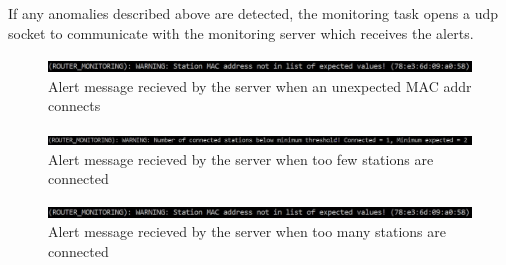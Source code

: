 If any anomalies described above are detected, the monitoring task opens a udp socket to communicate with the monitoring server which receives the alerts.

\begin{figure}[H]
\centering
\includegraphics[width=.9\linewidth]{images/monitoring_warning_mac_whitelist.jpeg}
\caption{Alert message recieved by the server when an unexpected MAC addr connects}
\label{fig:monitoring_alert_mac}
\end{figure}

\begin{figure}[H]
\centering
\includegraphics[width=.9\linewidth]{images/monitoring_warning_minimum_stations.jpeg}
\caption{Alert message recieved by the server when too few stations are connected}
\label{fig:monitoring_alert_few_stas}
\end{figure}

\begin{figure}[H]
\centering
\includegraphics[width=.9\linewidth]{images/monitoring_warning_mac_whitelist.jpeg}
\caption{Alert message recieved by the server when too many stations are connected}
\label{fig:monitoring_alert_many_stas}
\end{figure}